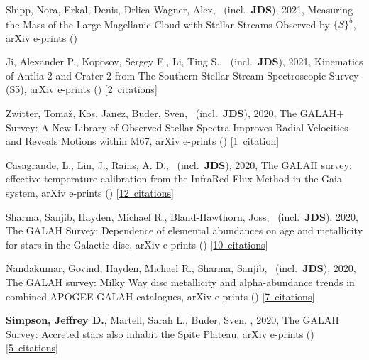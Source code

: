\item[{\color{numcolor}\scriptsize9}] Shipp, Nora, Erkal, Denis, Drlica-Wagner, Alex, \etal\ (incl.\ \textbf{JDS}), 2021, Measuring the Mass of the Large Magellanic Cloud with Stellar Streams Observed by ${\{}S{\}}^5$, arXiv e-prints ()

\item[{\color{numcolor}\scriptsize8}] Ji, Alexander P., Koposov, Sergey E., Li, Ting S., \etal\ (incl.\ \textbf{JDS}), 2021, Kinematics of Antlia 2 and Crater 2 from The Southern Stellar Stream Spectroscopic Survey (S5), arXiv e-prints () [\href{https://ui.adsabs.harvard.edu/#abs/2021arXiv210612656J}{2~citations}]

\item[{\color{numcolor}\scriptsize7}] Zwitter, Toma{\v{z}}, Kos, Janez, Buder, Sven, \etal\ (incl.\ \textbf{JDS}), 2020, The GALAH+ Survey: A New Library of Observed Stellar Spectra Improves Radial Velocities and Reveals Motions within M67, arXiv e-prints () [\href{https://ui.adsabs.harvard.edu/#abs/2020arXiv201212201Z}{1~citation}]

\item[{\color{numcolor}\scriptsize6}] Casagrande, L., Lin, J., Rains, A. D., \etal\ (incl.\ \textbf{JDS}), 2020, The GALAH survey: effective temperature calibration from the InfraRed Flux Method in the Gaia system, arXiv e-prints () [\href{https://ui.adsabs.harvard.edu/#abs/2020arXiv201102517C}{12~citations}]

\item[{\color{numcolor}\scriptsize5}] Sharma, Sanjib, Hayden, Michael R., Bland-Hawthorn, Joss, \etal\ (incl.\ \textbf{JDS}), 2020, The GALAH Survey: Dependence of elemental abundances on age and metallicity for stars in the Galactic disc, arXiv e-prints () [\href{https://ui.adsabs.harvard.edu/#abs/2020arXiv201113818S}{10~citations}]

\item[{\color{numcolor}\scriptsize4}] Nandakumar, Govind, Hayden, Michael R., Sharma, Sanjib, \etal\ (incl.\ \textbf{JDS}), 2020, The GALAH survey: Milky Way disc metallicity and alpha-abundance trends in combined APOGEE-GALAH catalogues, arXiv e-prints () [\href{https://ui.adsabs.harvard.edu/#abs/2020arXiv201102783N}{7~citations}]

\item[{\color{numcolor}\scriptsize3}] \textbf{Simpson, Jeffrey D.}, Martell, Sarah L., Buder, Sven, \etal, 2020, The GALAH Survey: Accreted stars also inhabit the Spite Plateau, arXiv e-prints () [\href{https://ui.adsabs.harvard.edu/#abs/2020arXiv201102659S}{5~citations}]

